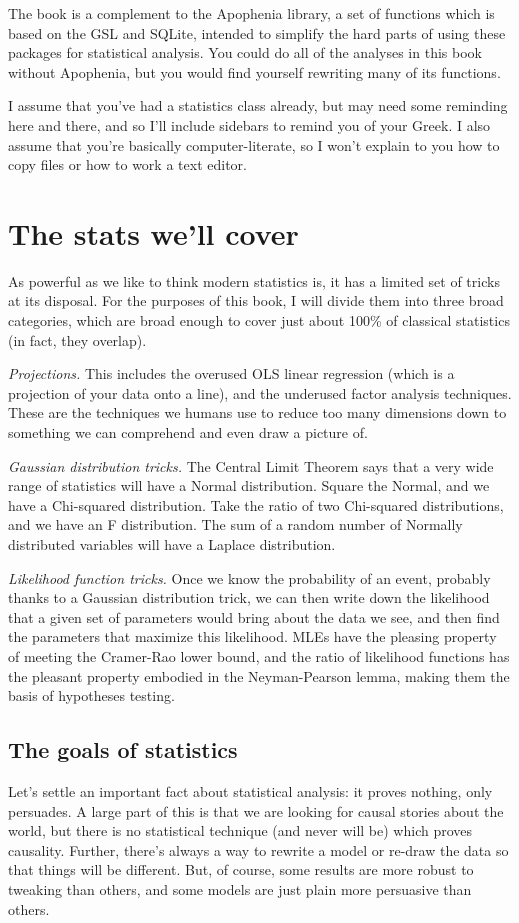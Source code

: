 \documentclass[12pt,notitlepage, openany]{book}
\def\ind#1{\index{#1}#1}
\begin{document}
The book is a complement to the \ind{Apophenia} library, a set of functions which
is based on the GSL and SQLite, intended to simplify the hard parts of
using these packages for statistical analysis. You could do all of the
analyses in this book without Apophenia, but you would find yourself
rewriting many of its functions.

I assume that you've had a statistics class already, but may need some reminding
here and there, and so I'll include sidebars to remind you of your Greek. I also
assume that you're basically computer-literate, so I won't explain to you how to
copy files or how to work a text editor.

\section{The stats we'll cover} 
As powerful as we like to think modern statistics is, it has a 
limited set of tricks at its disposal. For the purposes of this book,
I will divide them into three broad categories, which are broad enough
to cover just about 100\% of classical statistics (in fact, they overlap).

{\it Projections.} This includes the overused OLS linear regression (which is
a projection of your data onto a line), and the underused factor analysis
techniques. These are the techniques we humans use to reduce too many
dimensions down to something we can comprehend and even draw a picture of.

{\it Gaussian distribution tricks.} The Central Limit Theorem says that
a very wide range of statistics will have a Normal distribution. Square
the Normal, and we have a Chi-squared distribution. Take the ratio of two
Chi-squared distributions, and we have an F distribution.  The sum of
a random number of Normally distributed variables will have a Laplace
distribution.

{\it Likelihood function tricks.} Once we know the probability of an
event, probably thanks to a Gaussian distribution trick, we can then
write down the likelihood that a given set of parameters would bring
about the data we see, and then find the parameters that maximize this
likelihood. MLEs have the pleasing property of meeting the Cramer-Rao
lower bound, and the ratio of likelihood functions has the pleasant
property embodied in the Neyman-Pearson lemma, making them the basis of
hypotheses testing.

\subsection{The goals of statistics} Let's settle an
important fact about statistical analysis: it proves nothing, only
persuades. A large part of this is that we are looking for causal stories
about the world, but there is no statistical technique (and never will be)
which proves causality. Further, there's always a way to rewrite a model
or re-draw the data so that things will be different. But, of course,
some results are more robust to tweaking 
than others, and some models are just plain more persuasive than others.
\end{document}
